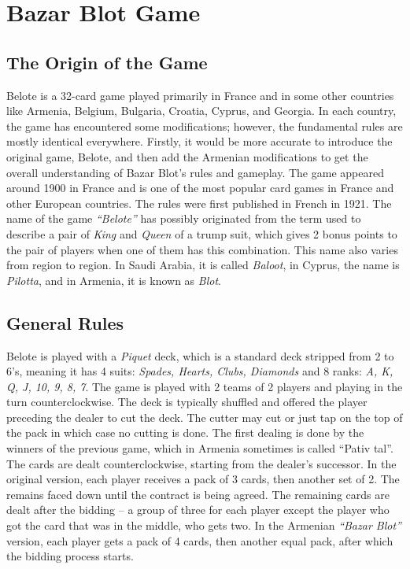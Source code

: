 \section{Bazar Blot Game}\label{GameIntro}\thispagestyle{SectionFirstPage} %
\subsection{The Origin of the Game}
\hspace{\parindent} Belote is a 32-card game played primarily in France and in some other countries like Armenia, Belgium, Bulgaria, Croatia, Cyprus, and Georgia.
In each country, the game has encountered some modifications; however, the fundamental rules are mostly identical everywhere.
Firstly, it would be more accurate to introduce the original game, Belote, and then add the Armenian modifications to get the overall understanding of Bazar Blot's rules and gameplay.
The game appeared around 1900 in France and is one of the most popular card games in France and other European countries.
The rules were first published in French in 1921.
The name of the game \textit{``Belote''} has possibly originated from the term used to describe a pair of \textit{King} and \textit{Queen} of a trump suit, which gives 2 bonus points to the pair of players when one of them has this combination.
This name also varies from region to region.
In Saudi Arabia, it is called \textit{Baloot}, in Cyprus, the name is \textit{Pilotta}, and in Armenia, it is known as \textit{Blot}.
\subsection{General Rules}
\hspace{\parindent} Belote is played with a \textit{Piquet} deck, which is a standard deck stripped from 2 to 6's, meaning it has 4 suits: \textit{Spades, Hearts, Clubs, Diamonds} and 8 ranks: \textit{A, K, Q, J, 10, 9, 8, 7}.
The game is played with 2 teams of 2 players and playing in the turn counterclockwise.
The deck is typically shuffled and offered the player preceding the dealer to cut the deck.
The cutter may cut or just tap on the top of the pack in which case no cutting is done.
The first dealing is done by the winners of the previous game, which in Armenia sometimes is called ``Pativ tal''.
The cards are dealt counterclockwise, starting from the dealer's successor.
In the original version, each player receives a pack of 3 cards, then another set of 2.
The remains faced down until the contract is being agreed.
The remaining cards are dealt after the bidding – a group of three for each player except the player who got the card that was in the middle, who gets two.
In the Armenian \textit{``Bazar Blot''} version, each player gets a pack of 4 cards, then another equal pack, after which the bidding process starts.
